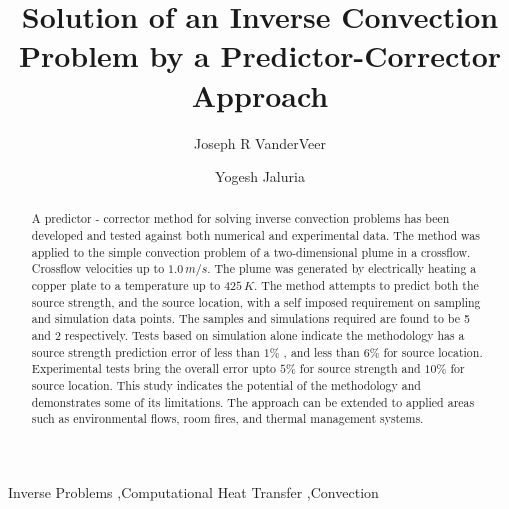 \documentclass[preprint,12pt]{elsarticle}
\begin{document}
\begin{frontmatter}
\title{Solution of an Inverse Convection Problem by a Predictor-Corrector Approach}

\author{Joseph R VanderVeer}
\author{Yogesh Jaluria}

\address{Department of Mechanical and Aerospace Engineering: Rutgers University, 98 Brett Rd, Piscataway NJ, 08854}



\begin{abstract}
A predictor - corrector method for solving inverse convection problems has been developed and tested against both numerical and experimental data.  The method was applied to the simple convection problem of a two-dimensional plume in a crossflow.  Crossflow velocities up to $1.0\, m/s$.  The plume was generated by electrically heating a copper plate to a temperature up to $425\, K$.  The method attempts to predict both the source strength, and the source location, with a self imposed requirement on sampling and simulation data points.  The samples and simulations required are found to be 5 and 2 respectively.  Tests based on simulation alone indicate the methodology has a source strength prediction error of less than $1\%$ , and less than $6\%$ for source location.  Experimental tests bring the overall error upto $5\%$ for source strength and $10\%$ for source location.  This study indicates the potential of the methodology and demonstrates some of its limitations.  The approach can be extended to applied areas such as environmental flows, room fires, and thermal management systems.

\end{abstract}
\begin{keyword}
Inverse Problems \sep Computational Heat Transfer \sep Convection
\end{keyword}
\end{frontmatter}


\newlength\figureheight 
\newlength\figurewidth 
	
	
	
	
\makenomenclature
\setlength{\nomitemsep}{-\parskip} %
\renewcommand*\nompreamble{\begin{multicols}{2}}
\renewcommand*\nompostamble{\end{multicols}}
\end{document}
